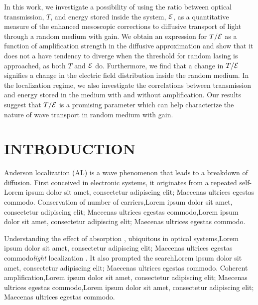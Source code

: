 In this work, we investigate a possibility of using the ratio between optical transmission, $T$, and energy stored inside the system, ${\cal E}$, as a quantitative measure of the enhanced mesoscopic corrections to diffusive transport of light through a random medium with gain. We obtain an expression for $T/{\cal E}$ as a function of amplification strength in the diffusive approximation and show that it does not a have tendency to diverge when the threshold for random lasing is approached, as both $T$ and ${\cal E}$ do. Furthermore, we find that a change in $T/{\cal E}$ signifies a change in the electric field distribution inside the random medium. In the localization regime, we also investigate the correlations between transmission and energy stored in the medium with and without amplification. Our results suggest that $T/{\cal E}$ is a promising parameter which can help characterize the nature of wave transport in random medium with gain.


\section{INTRODUCTION}
\label{sec:intro}

Anderson localization \cite{1958_Anderson} (AL) is a wave phenomenon \cite{1960_Ioffe_criterion,1984_John_prl,1985_Anderson} that leads to a breakdown of diffusion\cite{1980_Vollhardt_Wolfle,1991_Altshuler}. First conceived in electronic systems, it originates from  a repeated self-Lorem ipsum dolor sit amet, consectetur adipiscing elit; Maecenas ultrices egestas commodo. Conservation of number of carriers,Lorem ipsum dolor sit amet, consectetur adipiscing elit; Maecenas ultrices egestas commodo,Lorem ipsum dolor sit amet, consectetur adipiscing elit; Maecenas ultrices egestas commodo. 

Understanding the effect of absorption \cite{1984_John_prl}, ubiquitous in optical systems,Lorem ipsum dolor sit amet, consectetur adipiscing elit; Maecenas ultrices egestas commodo{\it light} localization \cite{1989_Genack,1997_wiersma_nature,1999_Maret,2000_chabanov_nature,2007_Maret,2007_Segev}. It also prompted the search\cite{2000_chabanov_nature}Lorem ipsum dolor sit amet, consectetur adipiscing elit; Maecenas ultrices egestas commodo. Coherent amplification,Lorem ipsum dolor sit amet, consectetur adipiscing elit; Maecenas ultrices egestas commodo\cite{2005_Cao},Lorem ipsum dolor sit amet, consectetur adipiscing elit; Maecenas ultrices egestas commodo.

